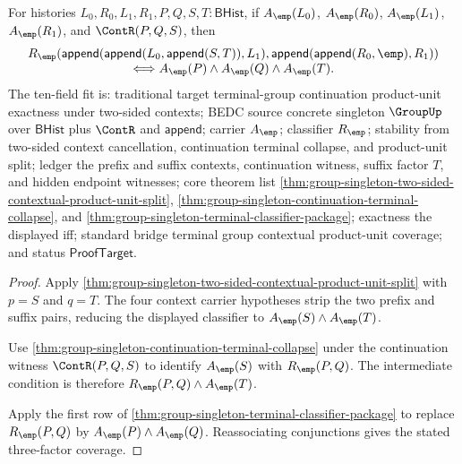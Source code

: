 \begin{theorem}
\label{thm:group-singleton-two-sided-contextual-continuation-product-unit-coverage}
For histories $L_0,R_0,L_1,R_1,P,Q,S,T:\mathsf{BHist}$, if
$A_{\emp}(L_0)$, $A_{\emp}(R_0)$, $A_{\emp}(L_1)$, $A_{\emp}(R_1)$, and
$\ContR(P,Q,S)$, then
$$
\begin{array}{c}
R_{\emp}(\mathsf{append}(\mathsf{append}(L_0,\mathsf{append}(S,T)),L_1),
\mathsf{append}(\mathsf{append}(R_0,\emp),R_1))\\
\Longleftrightarrow A_{\emp}(P)\land A_{\emp}(Q)\land A_{\emp}(T).
\end{array}
$$
The ten-field fit is: traditional target terminal-group continuation
product-unit exactness under two-sided contexts; BEDC source concrete singleton
$\GroupUp$ over $\mathsf{BHist}$ plus $\ContR$ and $\mathsf{append}$; carrier
$A_{\emp}$; classifier $R_{\emp}$; stability from two-sided context
cancellation, continuation terminal collapse, and product-unit split; ledger the
prefix and suffix contexts, continuation witness, suffix factor $T$, and hidden
endpoint witnesses; core theorem list
\autoref{thm:group-singleton-two-sided-contextual-product-unit-split},
\autoref{thm:group-singleton-continuation-terminal-collapse}, and
\autoref{thm:group-singleton-terminal-classifier-package}; exactness the
displayed iff; standard bridge terminal group contextual product-unit coverage;
and status $\mathsf{ProofTarget}$.
\end{theorem}
\begin{proof}
Apply \autoref{thm:group-singleton-two-sided-contextual-product-unit-split} with
$p=S$ and $q=T$. The four context carrier hypotheses strip the two prefix and
suffix pairs, reducing the displayed classifier to
$A_{\emp}(S)\land A_{\emp}(T)$.

Use \autoref{thm:group-singleton-continuation-terminal-collapse} under the
continuation witness $\ContR(P,Q,S)$ to identify $A_{\emp}(S)$ with
$R_{\emp}(P,Q)$. The intermediate condition is therefore
$R_{\emp}(P,Q)\land A_{\emp}(T)$.

Apply the first row of
\autoref{thm:group-singleton-terminal-classifier-package} to replace
$R_{\emp}(P,Q)$ by $A_{\emp}(P)\land A_{\emp}(Q)$. Reassociating conjunctions
gives the stated three-factor coverage.
\end{proof}

